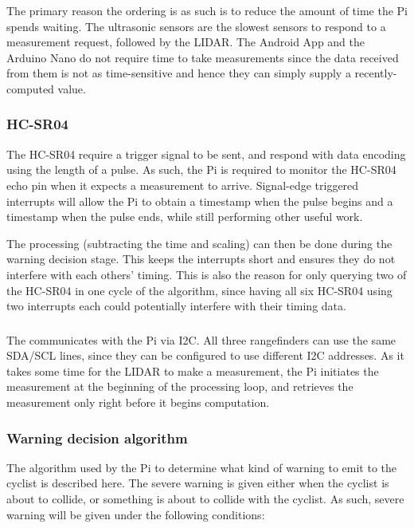 \documentclass[journal]{IEEEtran}
\begin{document}
The primary reason the ordering is as such is to reduce the amount of time the Pi spends waiting. The ultrasonic sensors are the slowest sensors to respond to a measurement request, followed by the LIDAR. The Android App and the Arduino Nano do not require time to take measurements since the data received from them is not as time-sensitive and hence they can simply supply a recently-computed value.

\subsubsection{HC-SR04}

The HC-SR04 require a trigger signal to be sent, and respond with data encoding using the length of a pulse. As such, the Pi is required to monitor the HC-SR04 echo pin when it expects a measurement to arrive. Signal-edge triggered interrupts will allow the Pi to obtain a timestamp when the pulse begins and a timestamp when the pulse ends, while still performing other useful work.

The processing (subtracting the time and scaling) can then be done during the warning decision stage. This keeps the interrupts short and ensures they do not interfere with each others' timing. This is also the reason for only querying two of the HC-SR04 in one cycle of the algorithm, since having all six HC-SR04 using two interrupts each could potentially interfere with their timing data.

\subsubsection{\lidar{}}

The \lidar{} communicates with the Pi via I2C. All three rangefinders can use the same SDA/SCL lines, since they can be configured to use different I2C addresses. As it takes some time for the LIDAR to make a measurement, the Pi initiates the measurement at the beginning of the processing loop, and retrieves the measurement only right before it begins computation.

\subsubsection{Warning decision algorithm}
The algorithm used by the Pi to determine what kind of warning to emit to the cyclist is described here. The severe warning is given either when the cyclist is about to collide, or something is about to collide with the cyclist. As such, severe warning will be given under the following conditions:
\end{document}
